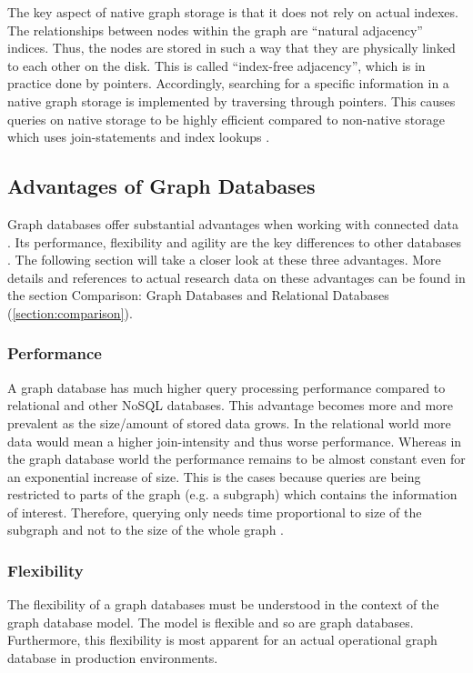 
The key aspect of native graph storage is that it does not rely on actual indexes. The relationships between nodes within the graph are “natural adjacency”\autocite{graphdb2015}  indices. Thus, the nodes are stored in such a way that they are physically linked to each other on the disk. This is called “index-free adjacency”\autocite{graphdb2015}, which is in practice done by pointers. Accordingly, searching for a specific information in a native graph storage is implemented by traversing through pointers. This causes queries on native storage to be highly efficient compared to non-native storage which uses join-statements and index lookups \autocite{graphdb2015} .

\subsection{Advantages of Graph Databases}
Graph databases offer substantial advantages when working with connected data \autocite{maheshlal2015}. Its performance, flexibility and agility are the key differences to other databases \autocite{graphdb2015}. The following section will take a closer look at these three advantages. More details and references to actual research data on these advantages can be found in the section Comparison: Graph Databases and Relational Databases (\ref{section:comparison}).

\subsubsection{Performance}
A graph database has much higher query processing performance compared to relational and other NoSQL databases. This advantage becomes more and more prevalent as the size/amount of stored data grows. In the relational world more data would mean a higher join-intensity and thus worse performance. Whereas in the graph database world the performance remains to be almost constant even for an exponential increase of size. This is the cases because queries are being restricted to parts of the graph (e.g. a subgraph) which contains the information of interest.  Therefore, querying only needs time proportional to size of the subgraph and not to the size of the whole graph \autocite{maheshlal2015, graphdb2015}.

\subsubsection{Flexibility}
The flexibility of a graph databases must be understood in the context of the graph database model. The model is flexible and so are graph databases. Furthermore, this flexibility is most apparent for an actual operational graph database in production environments.

